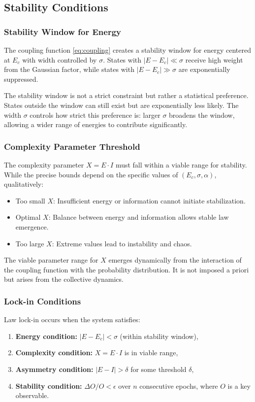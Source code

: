 \documentclass[12pt,a4paper]{article}
\theoremstyle{definition}
\theoremstyle{remark}
\begin{document}
\subsection{Stability Conditions}

\subsubsection{Stability Window for Energy}

The coupling function \eqref{eq:coupling} creates a stability window for energy centered at $E_c$ with width controlled by $\sigma$. States with $|E - E_c| \ll \sigma$ receive high weight from the Gaussian factor, while states with $|E - E_c| \gg \sigma$ are exponentially suppressed.

The stability window is not a strict constraint but rather a statistical preference. States outside the window can still exist but are exponentially less likely. The width $\sigma$ controls how strict this preference is: larger $\sigma$ broadens the window, allowing a wider range of energies to contribute significantly.

\subsubsection{Complexity Parameter Threshold}

The complexity parameter $X = E \cdot I$ must fall within a viable range for stability. While the precise bounds depend on the specific values of $(E_c, \sigma, \alpha)$, qualitatively:
\begin{itemize}
\item Too small $X$: Insufficient energy or information cannot initiate stabilization.
\item Optimal $X$: Balance between energy and information allows stable law emergence.
\item Too large $X$: Extreme values lead to instability and chaos.
\end{itemize}

The viable parameter range for $X$ emerges dynamically from the interaction of the coupling function with the probability distribution. It is not imposed a priori but arises from the collective dynamics.

\subsubsection{Lock-in Conditions}

Law lock-in occurs when the system satisfies:
\begin{enumerate}
\item \textbf{Energy condition:} $|E - E_c| < \sigma$ (within stability window),
\item \textbf{Complexity condition:} $X = E \cdot I$ is in viable range,
\item \textbf{Asymmetry condition:} $|E - I| > \delta$ for some threshold $\delta$,
\item \textbf{Stability condition:} $\Delta O/O < \epsilon$ over $n$ consecutive epochs, where $O$ is a key observable.
\end{enumerate}
\end{document}
